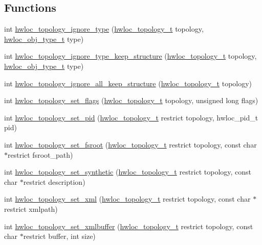 \subsection*{Functions}
\begin{DoxyCompactItemize}
\item 
 int \hyperlink{a00044_gaf2071c8621fddc53649c245d87835b47}{hwloc\_\-topology\_\-ignore\_\-type} (\hyperlink{a00039_ga9d1e76ee15a7dee158b786c30b6a6e38}{hwloc\_\-topology\_\-t} topology, \hyperlink{a00041_gacd37bb612667dc437d66bfb175a8dc55}{hwloc\_\-obj\_\-type\_\-t} type)
\item 
 int \hyperlink{a00044_ga6ddd4213d95bd1c30555b294a60efa6b}{hwloc\_\-topology\_\-ignore\_\-type\_\-keep\_\-structure} (\hyperlink{a00039_ga9d1e76ee15a7dee158b786c30b6a6e38}{hwloc\_\-topology\_\-t} topology, \hyperlink{a00041_gacd37bb612667dc437d66bfb175a8dc55}{hwloc\_\-obj\_\-type\_\-t} type)
\item 
 int \hyperlink{a00044_gaec6fb00050f50cd41007f1ae580d2106}{hwloc\_\-topology\_\-ignore\_\-all\_\-keep\_\-structure} (\hyperlink{a00039_ga9d1e76ee15a7dee158b786c30b6a6e38}{hwloc\_\-topology\_\-t} topology)
\item 
 int \hyperlink{a00044_ga6d11e53db143ac39c32cdb3912b71f99}{hwloc\_\-topology\_\-set\_\-flags} (\hyperlink{a00039_ga9d1e76ee15a7dee158b786c30b6a6e38}{hwloc\_\-topology\_\-t} topology, unsigned long flags)
\item 
 int \hyperlink{a00044_gae1100de0162b3c6a9db750ac14629c05}{hwloc\_\-topology\_\-set\_\-pid} (\hyperlink{a00039_ga9d1e76ee15a7dee158b786c30b6a6e38}{hwloc\_\-topology\_\-t} restrict topology, hwloc\_\-pid\_\-t pid)
\item 
 int \hyperlink{a00044_ga2f6bfb6958d8b508ea1d7d5bb266432c}{hwloc\_\-topology\_\-set\_\-fsroot} (\hyperlink{a00039_ga9d1e76ee15a7dee158b786c30b6a6e38}{hwloc\_\-topology\_\-t} restrict topology, const char $\ast$restrict fsroot\_\-path)
\item 
 int \hyperlink{a00044_ga2fcb52181b586c20f001b7a999550324}{hwloc\_\-topology\_\-set\_\-synthetic} (\hyperlink{a00039_ga9d1e76ee15a7dee158b786c30b6a6e38}{hwloc\_\-topology\_\-t} restrict topology, const char $\ast$restrict description)
\item 
 int \hyperlink{a00044_ga93efcc8a962afe1ed23393700682173f}{hwloc\_\-topology\_\-set\_\-xml} (\hyperlink{a00039_ga9d1e76ee15a7dee158b786c30b6a6e38}{hwloc\_\-topology\_\-t} restrict topology, const char $\ast$restrict xmlpath)
\item 
 int \hyperlink{a00044_gae7e4bade144652a2b48f5eaf0309b4ec}{hwloc\_\-topology\_\-set\_\-xmlbuffer} (\hyperlink{a00039_ga9d1e76ee15a7dee158b786c30b6a6e38}{hwloc\_\-topology\_\-t} restrict topology, const char $\ast$restrict buffer, int size)

\end{DoxyCompactItemize}
